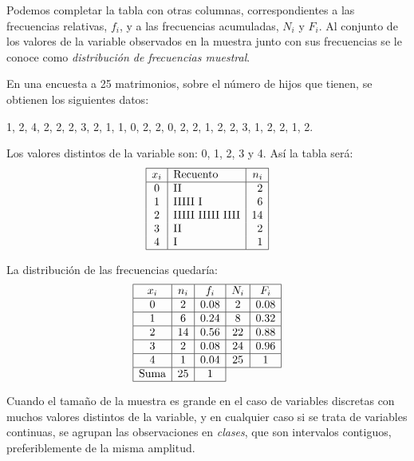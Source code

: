 Podemos completar la tabla con otras columnas, correspondientes a las frecuencias relativas, $f_i$, y a las frecuencias
acumuladas, $N_i$ y $F_i$. Al conjunto de los valores de la variable observados en la muestra junto con sus frecuencias
se le conoce como \emph{distribución de frecuencias muestral}.

\begin{ejemplo}
En una encuesta a 25 matrimonios, sobre el número de hijos que tienen, se obtienen los siguientes datos:
\begin{center}
1, 2, 4, 2, 2, 2, 3, 2, 1, 1, 0, 2, 2, 0, 2, 2, 1, 2, 2, 3, 1, 2,
2, 1, 2.
\end{center}

Los valores distintos de la variable son: 0, 1, 2, 3 y 4. Así la tabla será:
  \[\begin{array}{|c|l|r|}
    \hline
    x_i & \mbox{Recuento} & n_i \\ \hline
    0 & \mbox{II} & 2 \\
    1 & \mbox{IIIII I} & 6 \\
    2 & \mbox{IIIII IIIII IIII} & 14 \\
    3 & \mbox{II} & 2 \\
    4 & \mbox{I} & 1 \\ \hline

  \end{array}
  \]

La distribución de las frecuencias quedaría:
  \[\begin{array}{|c|c|c|c|c|}
    \hline
    x_i & n_i & f_i & N_i & F_i \\ \hline
    0 & 2 & 0.08 & 2 & 0.08 \\ \hline
    1 & 6 & 0.24 & 8 & 0.32 \\ \hline
    2 & 14 & 0.56 & 22 & 0.88 \\ \hline
    3 & 2 & 0.08 & 24 & 0.96 \\ \hline
    4 & 1 & 0.04 & 25 & 1 \\ \hline
    \mbox{Suma} & 25 & 1 & \multicolumn{2}{c}{} \\
    \cline{1-3}
  \end{array}
  \]
\end{ejemplo}

Cuando el tamaño de la muestra es grande en el caso de variables discretas con muchos valores distintos de la variable,
y en cualquier caso si se trata de variables continuas, se agrupan las observaciones en \emph{clases}, que son
intervalos contiguos, preferiblemente de la misma amplitud.

